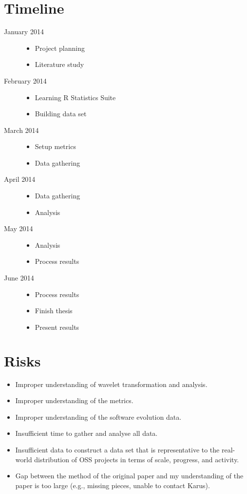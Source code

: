 \section{Timeline}
\begin{description}
	\item[January 2014] \hfill
		\begin{itemize}
			\item Project planning
			\item Literature study
		\end{itemize}
	\item[February 2014] \hfill
		\begin{itemize}
			\item Learning R Statistics Suite
			\item Building data set
		\end{itemize}
	\item[March 2014] \hfill
		\begin{itemize}
			\item Setup metrics
			\item Data gathering
		\end{itemize}
	\item[April 2014] \hfill
		\begin{itemize}
			\item Data gathering
			\item Analysis
		\end{itemize}
	\item[May 2014] \hfill
		\begin{itemize}
			\item Analysis
			\item Process results
		\end{itemize}
	\item[June 2014] \hfill
		\begin{itemize}
			\item Process results
			\item Finish thesis
			\item Present results
		\end{itemize}
\end{description}

\section{Risks}
\begin{itemize}
	\item Improper understanding of wavelet transformation and analysis.
	\item Improper understanding of the metrics.
	\item Improper understanding of the software evolution data.
	\item Insufficient time to gather and analyse all data.
	\item Insufficient data to construct a data set that is representative to the
	real-world distribution of OSS projects in terms of scale, progress, and
	activity.
	\item Gap between the method of the original paper and my understanding of the
	paper is too large (e.g., missing pieces, unable to contact Karus).
\end{itemize}
